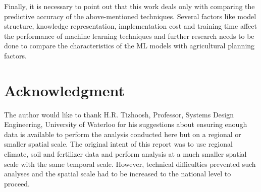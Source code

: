 \documentclass[conference]{IEEEtran}
\begin{document}
Finally, it is necessary to point out that this work deals only with comparing the predictive accuracy of the above-mentioned techniques. Several factors like model structure, knowledge representation, implementation cost and training time affect the performance of machine learning techniques and further research needs to be done to compare the characteristics of the ML models with agricultural planning factors.
\section*{Acknowledgment}
The author would like to thank H.R. Tizhoosh, Professor, Systems Design Engineering, University of Waterloo for his suggestions about ensuring enough data is available to perform the analysis conducted here but on a regional or smaller spatial scale. The original intent of this report was to use regional climate, soil and fertilizer data and perform analysis at a much smaller spatial scale with the same temporal scale. However, technical difficulties prevented such analyses and the spatial scale had to be increased to the national level to proceed.




\end{document}
